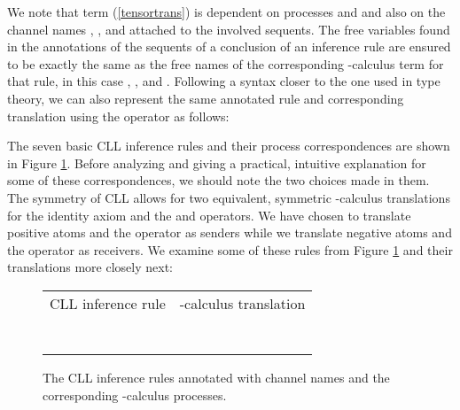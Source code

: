 \documentclass[copyright,creativecommons]{eptcs}
\begin{document}
We note that term (\ref{tensortrans}) is dependent on processes  and  and also on the channel names , ,  and  attached to the involved sequents. The free variables found in the annotations of the sequents of a conclusion of an inference rule are ensured to be exactly the same as the free names of the corresponding -calculus term for that rule, in this case , , and . Following a syntax closer to the one used in type theory, we can also represent the same annotated rule and corresponding translation using the  operator as follows:



The seven basic CLL inference rules and their process correspondences are shown in Figure \ref{CLLpi}. Before analyzing and giving a practical, intuitive explanation for some of these correspondences, we should note the two choices made in them. The symmetry of CLL allows for two equivalent, symmetric -calculus translations for the identity axiom and the  and  operators. We have chosen to translate positive atoms and the  operator as senders while we translate negative atoms and the  operator as receivers. We examine some of these rules from Figure \ref{CLLpi} and their translations more closely next:

\begin{figure}[htb]
	\centering
	\footnotesize
		\begin{tabular}{>{\centering\arraybackslash}m{.4\linewidth} >{\centering\arraybackslash}m{.55\linewidth}}
		CLL inference rule & -calculus translation \\
		\vspace*{3mm}
		 &  \\
		\vspace*{-5mm}
		 & 
		 \\
		\vspace*{-7mm}
		 &  \\
		\vspace*{-7mm}
		 &  \\
		\vspace*{-7mm}
		 &  \\
		\vspace*{-7mm}
		 & 
		 \\
		\vspace*{-7mm}
		 & 
		 \\
		\end{tabular}
			\caption{The CLL inference rules annotated with channel names and the corresponding -calculus processes.}
			\label{CLLpi}
\end{figure}
\end{document}
